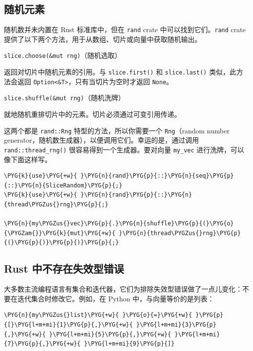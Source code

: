 \subsection{随机元素}

随机数并未内置在 Rust 标准库中，但在 \texttt{rand} crate 中可以找到它们。\texttt{rand} crate 提供了以下两个方法，用于从数组、切片或向量中获取随机输出。

\begin{myNote}
\texttt{slice.choose(\&mut rng)}（随机选取）
\end{myNote}

返回对切片中随机元素的引用。与 \texttt{slice.first()} 和 \texttt{slice.last()} 类似，此方法会返回 \texttt{Option<\&T>}，只有当切片为空时才返回 \texttt{None}。

\begin{myNote}
\texttt{slice.shuffle(\&mut rng)}（随机洗牌）
\end{myNote}

就地随机重排切片中的元素。切片必须通过可变引用传递。

这两个都是 \texttt{rand::Rng} 特型的方法，所以你需要一个 \texttt{Rng}（random number generator，随机数生成器），以便调用它们。幸运的是，通过调用 \texttt{rand::thread\_rng()} 很容易得到一个生成器。要对向量 \texttt{my\_vec} 进行洗牌，可以像下面这样写。

\begin{Verbatim}[commandchars=\\\{\},breaklines=true,breakanywhere=true,fontsize=\codefont,xleftmargin=17bp]
\PYG{k}{use}\PYG{+w}{ }\PYG{n}{rand}\PYG{p}{::}\PYG{n}{seq}\PYG{p}{::}\PYG{n}{SliceRandom}\PYG{p}{;}
\PYG{k}{use}\PYG{+w}{ }\PYG{n}{rand}\PYG{p}{::}\PYG{n}{thread\PYGZus{}rng}\PYG{p}{;}

\PYG{n}{my\PYGZus{}vec}\PYG{p}{.}\PYG{n}{shuffle}\PYG{p}{(}\PYG{o}{\PYGZam{}}\PYG{k}{mut}\PYG{+w}{ }\PYG{n}{thread\PYGZus{}rng}\PYG{p}{(}\PYG{p}{)}\PYG{p}{)}\PYG{p}{;}
\end{Verbatim}

\subsection{Rust 中不存在失效型错误}

大多数主流编程语言有集合和迭代器，它们为排除失效型错误做了一点儿变化：不要在迭代集合时修改它。例如，在 Python 中，与向量等价的是列表：

\begin{Verbatim}[commandchars=\\\{\},breaklines=true,breakanywhere=true,fontsize=\codefont,xleftmargin=17bp]
\PYG{n}{my\PYGZus{}list}\PYG{+w}{ }\PYG{o}{=}\PYG{+w}{ }\PYG{p}{[}\PYG{l+m+mi}{1}\PYG{p}{,}\PYG{+w}{ }\PYG{l+m+mi}{3}\PYG{p}{,}\PYG{+w}{ }\PYG{l+m+mi}{5}\PYG{p}{,}\PYG{+w}{ }\PYG{l+m+mi}{7}\PYG{p}{,}\PYG{+w}{ }\PYG{l+m+mi}{9}\PYG{p}{]}
\end{Verbatim}

